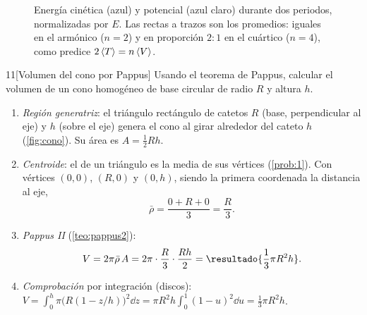 \begin{figure}[ht]
\centering
{}
\caption{Energía cinética (azul) y potencial (azul claro) durante dos periodos,
normalizadas por $E$. Las rectas a trazos son los promedios: iguales en el
armónico ($n=2$) y en proporción $2:1$ en el cuártico ($n=4$), como predice
$2\left\langle T\right\rangle=n\left\langle V\right\rangle$.}
\label{fig:virial}
\end{figure}

\begin{problema}{11}[Volumen del cono por Pappus]
\label{prob:11}
Usando el teorema de Pappus, calcular el volumen de un cono homogéneo de
base circular de radio $R$ y altura $h$.
\end{problema}

\begin{resolucion}
\begin{enumerate}
  \item \emph{Región generatriz}: el triángulo rectángulo de catetos $R$ (base,
  perpendicular al eje) y $h$ (sobre el eje) genera el cono al girar alrededor
  del cateto $h$ (\cref{fig:cono}). Su área es $A=\tfrac12Rh$.
  \item \emph{Centroide}: el de un triángulo es la media de sus vértices
  (\cref{prob:1}). Con vértices $(0,0)$, $(R,0)$ y $(0,h)$, siendo la primera coordenada la
  distancia al eje,
  \[
    \bar\rho=\frac{0+R+0}{3}=\frac R3 .
  \]
  \item \emph{Pappus II} (\cref{teo:pappus2}):
  \[
    V=2\pi\bar\rho\,A=2\pi\cdot\frac R3\cdot\frac{Rh}{2}=\resultado{\frac13\pi R^{2}h} .
  \]
  \item \emph{Comprobación} por integración (discos):
  $V=\int_{0}^{h}\pi\bigl(R(1-z/h)\bigr)^{2}\dd z=\pi R^{2}h\int_{0}^{1}(1-u)^{2}\dd u=\tfrac13\pi R^{2}h$.\qedhere
\end{enumerate}
\end{resolucion}

